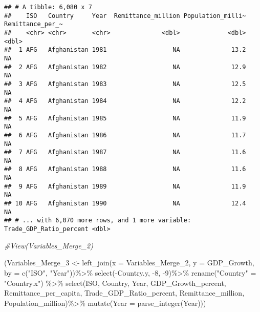 \documentclass[
]{article}
\newenvironment{Shaded}{\begin{snugshade}}{\end{snugshade}}
\newcommand{\AttributeTok}[1]{\textcolor[rgb]{0.77,0.63,0.00}{#1}}
\newcommand{\CommentTok}[1]{\textcolor[rgb]{0.56,0.35,0.01}{\textit{#1}}}
\newcommand{\DecValTok}[1]{\textcolor[rgb]{0.00,0.00,0.81}{#1}}
\newcommand{\FunctionTok}[1]{\textcolor[rgb]{0.00,0.00,0.00}{#1}}
\newcommand{\NormalTok}[1]{#1}
\newcommand{\OtherTok}[1]{\textcolor[rgb]{0.56,0.35,0.01}{#1}}
\newcommand{\SpecialCharTok}[1]{\textcolor[rgb]{0.00,0.00,0.00}{#1}}
\newcommand{\StringTok}[1]{\textcolor[rgb]{0.31,0.60,0.02}{#1}}
\begin{document}
\begin{verbatim}
## # A tibble: 6,080 x 7
##    ISO   Country     Year  Remittance_million Population_milli~ Remittance_per_~
##    <chr> <chr>       <chr>              <dbl>             <dbl>            <dbl>
##  1 AFG   Afghanistan 1981                  NA              13.2               NA
##  2 AFG   Afghanistan 1982                  NA              12.9               NA
##  3 AFG   Afghanistan 1983                  NA              12.5               NA
##  4 AFG   Afghanistan 1984                  NA              12.2               NA
##  5 AFG   Afghanistan 1985                  NA              11.9               NA
##  6 AFG   Afghanistan 1986                  NA              11.7               NA
##  7 AFG   Afghanistan 1987                  NA              11.6               NA
##  8 AFG   Afghanistan 1988                  NA              11.6               NA
##  9 AFG   Afghanistan 1989                  NA              11.9               NA
## 10 AFG   Afghanistan 1990                  NA              12.4               NA
## # ... with 6,070 more rows, and 1 more variable: Trade_GDP_Ratio_percent <dbl>
\end{verbatim}

\begin{Shaded}
\begin{Highlighting}[]
\CommentTok{\#View(Variables\_Merge\_2)}

\NormalTok{(Variables\_Merge\_3 }\OtherTok{\textless{}{-}} \FunctionTok{left\_join}\NormalTok{(}\AttributeTok{x =}\NormalTok{ Variables\_Merge\_2, }\AttributeTok{y =}\NormalTok{ GDP\_Growth, }\AttributeTok{by =} \FunctionTok{c}\NormalTok{(}\StringTok{"ISO"}\NormalTok{, }\StringTok{"Year"}\NormalTok{))}\SpecialCharTok{\%\textgreater{}\%}
  \FunctionTok{select}\NormalTok{(}\SpecialCharTok{{-}}\NormalTok{Country.y, }\SpecialCharTok{{-}}\DecValTok{8}\NormalTok{, }\SpecialCharTok{{-}}\DecValTok{9}\NormalTok{)}\SpecialCharTok{\%\textgreater{}\%}
  \FunctionTok{rename}\NormalTok{(}\StringTok{"Country"} \OtherTok{=} \StringTok{"Country.x"}\NormalTok{) }\SpecialCharTok{\%\textgreater{}\%}
  \FunctionTok{select}\NormalTok{(ISO, Country, Year, GDP\_Growth\_percent, Remittance\_per\_capita, Trade\_GDP\_Ratio\_percent, Remittance\_million, Population\_million)}\SpecialCharTok{\%\textgreater{}\%}
  \FunctionTok{mutate}\NormalTok{(}\AttributeTok{Year =} \FunctionTok{parse\_integer}\NormalTok{(Year)))}
\end{Highlighting}
\end{Shaded}
\end{document}
